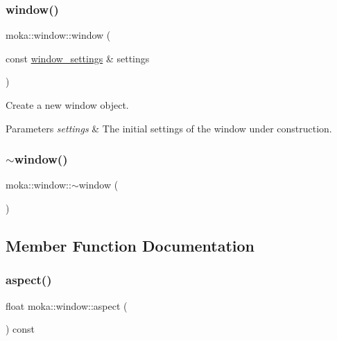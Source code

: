\subsubsection{\texorpdfstring{window()}{window()}\hspace{0.1cm}{\footnotesize\ttfamily [3/3]}}
{\footnotesize\ttfamily moka\+::window\+::window (\begin{DoxyParamCaption}\item[{const \mbox{\hyperlink{structmoka_1_1window__settings}{window\+\_\+settings}} \&}]{settings }\end{DoxyParamCaption})\hspace{0.3cm}{\ttfamily [explicit]}}



Create a new window object. 


\begin{DoxyParams}{Parameters}
{\em settings} & The initial settings of the window under construction. \\
\hline
\end{DoxyParams}
\mbox{\label{classmoka_1_1window_aaf7bdf23272f0ef95201a93d452246c7}} 
\subsubsection{\texorpdfstring{$\sim$window()}{~window()}}
{\footnotesize\ttfamily moka\+::window\+::$\sim$window (\begin{DoxyParamCaption}{ }\end{DoxyParamCaption})}



\subsection{Member Function Documentation}
\mbox{\label{classmoka_1_1window_a7517a29909b0b315b36db0b49ca7ddc3}} 
\subsubsection{\texorpdfstring{aspect()}{aspect()}}
{\footnotesize\ttfamily float moka\+::window\+::aspect (\begin{DoxyParamCaption}{ }\end{DoxyParamCaption}) const}



